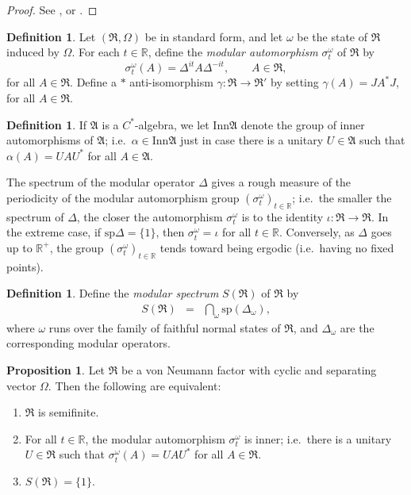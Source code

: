 \documentclass[12pt]{article}
\theoremstyle{definition}
\newtheorem{prop}[thm]{Proposition}
\theoremstyle{definition}
\newtheorem{defn}[thm]{Definition}
\theoremstyle{remark}
\def\7#1{{\mathbb #1}}
\def\al#1{{\mathfrak #1}}
\def\a{\alpha} \def\b{\beta} \def\g{\gamma} \def\d{\delta}
\def\om{\omega} \def\Om{\Omega} \def\dd{\partial} \def\D{\Delta}
\newcommand{\Inn}{\mathrm{Inn}}
\begin{document}
\begin{proof} See \cite[Thm.\ 9.2.9]{kr}, or \cite[Thm.\
  2.3.3]{sunder}.
\end{proof}

\begin{defn} Let $(\al R,\Om )$ be in standard form, and let $\om$ be
  the state of $\al R$ induced by $\Om$.  For each $t\in \7R$, define
  the \emph{modular automorphism} $\sigma ^{\om}_t$ of $\al R$ by
$$\sigma ^{\om}_t(A)=\D ^{it}A\D ^{-it} ,\qquad A \in  \al R ,$$
for all $A\in \al R$.  Define a $*$ anti-isomorphism
$\g :\al R\to \al R'$ by setting $\g (A)=JA^*J$, for
all $A\in \al R$.  \end{defn}

\begin{defn} If $\al A$ is a $C^*$-algebra, we let $\Inn \al A$ denote
  the group of inner automorphisms of $\al A$; i.e.\ $\a \in \Inn \al
  A$ just in case there is a unitary $U\in \al A$ such that $\a
  (A)=UAU^*$ for all $A\in \al A$.  \end{defn}

The spectrum of the modular operator $\D$ gives a rough
measure of the periodicity of the modular automorphism
group $( \sigma ^{\om}_t)_{t\in \7R}$; i.e.\ the
smaller the spectrum of $\D$, the closer the
automorphism $\sigma ^{\om}_t$ is to the identity
$\iota :\al R\to \al R$.  In the extreme case, if
$\mathrm{sp}\D=\{ 1\}$, then $\sigma ^{\om}_t=\iota$
for all $t\in \7R$.  Conversely, as $\D$ goes up to
$\7R ^+$, the group $(\sigma _t^{\om})_{t\in \7R}$
tends toward being ergodic (i.e.\ having no fixed
points).

\begin{defn} Define the \emph{modular spectrum} $S(\al
  R)$ of $\al R$ by \begin{eqnarray*} S(\al R) &=&
    \bigcap _{\om }\mathrm{sp} (\D _{\om }
    ),\end{eqnarray*} where $\om$ runs over the family
  of faithful normal states of $\al R$, and $\D _\om$
  are the corresponding modular operators.
\end{defn}


\begin{prop} Let $\al R$ be a von Neumann factor with cyclic and
  separating vector $\Om $.  Then the following are equivalent:
  \begin{enumerate}
  \item $\al R$ is semifinite.
\item For all $t\in \7R$, the modular automorphism $\sigma ^{\om}_t$
  is inner; i.e.\ there is a unitary $U\in \al R$ such that $\sigma
  ^{\om}_t(A)=UAU^*$ for all $A\in \al R$.
\item $S(\al R)=\{ 1\}$. \end{enumerate}
\end{prop}
\end{document}
